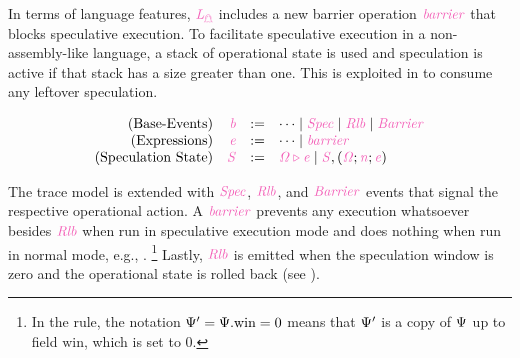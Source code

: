 \documentclass[acmsmall]{acmart}
\theoremstyle{definition}
\begin{document}
In terms of language features, $\Lspec$ includes a new barrier operation $\ird{\lbarrier}$ that blocks speculative execution. 
To facilitate speculative execution in a non-assembly-like language, a stack of operational state is used and speculation is active if that stack has a size greater than one.
This is exploited in  to consume any leftover speculation.

\vspace{-.5em}
\[
  \begin{array}{rrcl}
    \text{(Base-Events)} & \ird{\preevent} &:=& \dots \mid \ird{Spec} \mid \ird{Rlb} \mid \ird{Barrier}\\
    \text{(Expressions)} & \ird{\expr} &:=& \dots \mid \ird{\lbarrier} \\
    \text{(Speculation State)} & \ird{S} &:=& \ird{\Omega\triangleright\expr} \mid \ird{S},\left(\ird{\Omega};\ird{n};\ird{\expr}\right)
  \end{array}
\]

\begin{center}
\newcommand{\expreval}[5]{{#1}\triangleright\xspace {#2}\xrightarrow{#5}\ {#3}\triangleright\xspace {#4}\xspace}
\newcommand{\exprevald}[5]{\expreval{\ird{#1}}{\ird{#2}}{\ird{#3}}{\ird{#4}}{\ird{#5}}}

\end{center}

The trace model is extended with $\ird{{Spec}}$, $\ird{{Rlb}}$, and $\ird{{Barrier}}$ events that signal the respective operational action. 
A $\ird{\lbarrier}$ prevents any execution whatsoever besides $\ird{{Rlb}}$ when run in speculative execution mode and does nothing when run in normal mode, e.g., .%
\footnote{In the rule, the notation $\cfstate' = \cfstate[.\text{win} = 0]$ means that $\cfstate'$ is a copy of $\cfstate$ up to field $\text{win}$, which is set to $0$.}
Lastly, $\ird{Rlb}$ is emitted when the speculation window is zero and the operational state is rolled back (see ). 
\end{document}
